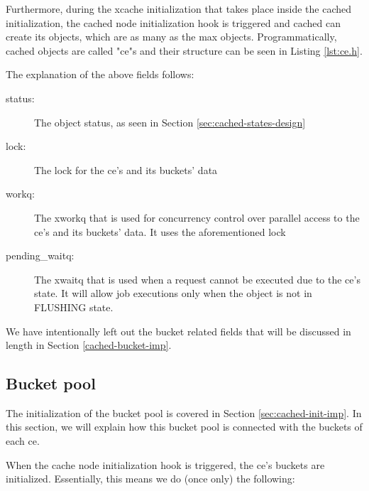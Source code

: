 Furthermore, during the xcache initialization that takes place inside the 
cached initialization, the cached node initialization hook is triggered and 
cached can create its objects, which are as many as the max objects.  
Programmatically, cached objects are called "ce"s and their structure can be 
seen in Listing \ref{lst:ce.h}.


The explanation of the above fields follows:

\begin{description}
	\item[status:] The object status, as seen in Section 
		\ref{sec:cached-states-design}
	\item[lock:] The lock for the ce's and its buckets' data
	\item[workq:] The xworkq that is used for concurrency control over 
		parallel access to the ce's and its buckets' data. It uses the 
		aforementioned lock
	\item[pending\_waitq:] The xwaitq that is used when a request cannot be 
		executed due to the ce's state. It will allow job executions 
		only when the object is not in FLUSHING state.
\end{description}

We have intentionally left out the bucket related fields that will be discussed 
in length in Section \ref{cached-bucket-imp}.

\subsection{Bucket pool}\label{sec:cached-bucket-imp}

The initialization of the bucket pool is covered in Section 
\ref{sec:cached-init-imp}. In this section, we will explain how this bucket 
pool is connected with the buckets of each ce.

When the cache node initialization hook is triggered, the ce's buckets are 
initialized. Essentially, this means we do (once only) the following:

